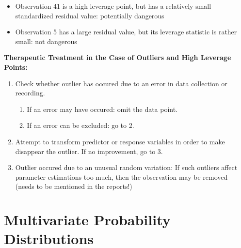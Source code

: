 \documentclass[11pt]{article}
\begin{document}
\begin{itemize}[noitemsep]
	\item Observation 41 is a high leverage point, but has a relatively small standardized residual value: potentially dangerous
	\item Observation 5 has a large residual value, but its leverage statistic is rather small: not dangerous
\end{itemize}


\begin{definition}
\textbf{Therapeutic Treatment in the Case of Outliers and High Leverage Points:}
\begin{enumerate}[noitemsep]
	\item Check whether outlier has occured due to an error in data collection or recording.
	\begin{enumerate}[noitemsep]
		\item If an error may have occured: omit the data point.
		\item If an error can be excluded: go to 2.
	\end{enumerate}	
	\item Attempt to transform predictor or response variables in order to make disappear the outlier. If no improvement, go to 3.
	\item Outlier occured due to an unusual random variation: If such outliers affect parameter estimations too much, then the observation may be	removed (needs to be mentioned in the reports!)
\end{enumerate}
\end{definition}









\newpage
\section{Multivariate Probability Distributions}
\end{document}
